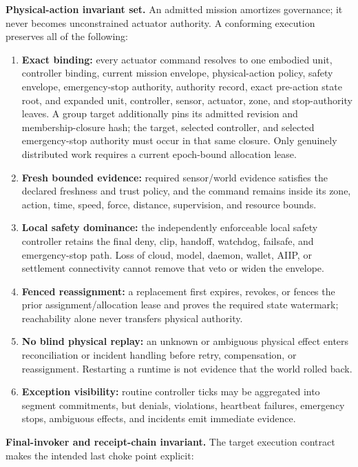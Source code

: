 \documentclass[
  11pt,
]{article}
\providecommand{\tightlist}{%
  \setlength{\itemsep}{0pt}\setlength{\parskip}{0pt}}
\begin{document}
\textbf{Physical-action invariant set.} An admitted mission amortizes
governance; it never becomes unconstrained actuator authority. A conforming
execution preserves all of the following:

\begin{enumerate}
\def\labelenumi{\arabic{enumi}.}
\tightlist
\item
  \textbf{Exact binding:} every actuator command resolves to one embodied
  unit, controller binding, current mission envelope, physical-action policy,
  safety envelope, emergency-stop authority, authority record, exact
  pre-action state root, and expanded unit, controller, sensor, actuator, zone,
  and stop-authority leaves. A group target additionally pins its admitted
  revision and membership-closure hash; the target, selected controller, and
  selected emergency-stop authority must occur in that same closure. Only
  genuinely distributed work requires a current epoch-bound allocation lease.
\item
  \textbf{Fresh bounded evidence:} required sensor/world evidence satisfies
  the declared freshness and trust policy, and the command remains inside its
  zone, action, time, speed, force, distance, supervision, and resource bounds.
\item
  \textbf{Local safety dominance:} the independently enforceable local safety
  controller retains the final deny, clip, handoff, watchdog, failsafe, and
  emergency-stop path. Loss of cloud, model, daemon, wallet, AIIP, or settlement
  connectivity cannot remove that veto or widen the envelope.
\item
  \textbf{Fenced reassignment:} a replacement first expires, revokes, or fences
  the prior assignment/allocation lease and proves the required state watermark;
  reachability alone never transfers physical authority.
\item
  \textbf{No blind physical replay:} an unknown or ambiguous physical effect
  enters reconciliation or incident handling before retry, compensation, or
  reassignment. Restarting a runtime is not evidence that the world rolled back.
\item
  \textbf{Exception visibility:} routine controller ticks may be aggregated
  into segment commitments, but denials, violations, heartbeat failures,
  emergency stops, ambiguous effects, and incidents emit immediate evidence.
\end{enumerate}

\textbf{Final-invoker and receipt-chain invariant.} The target execution
contract makes the intended last choke point explicit:
\end{document}
